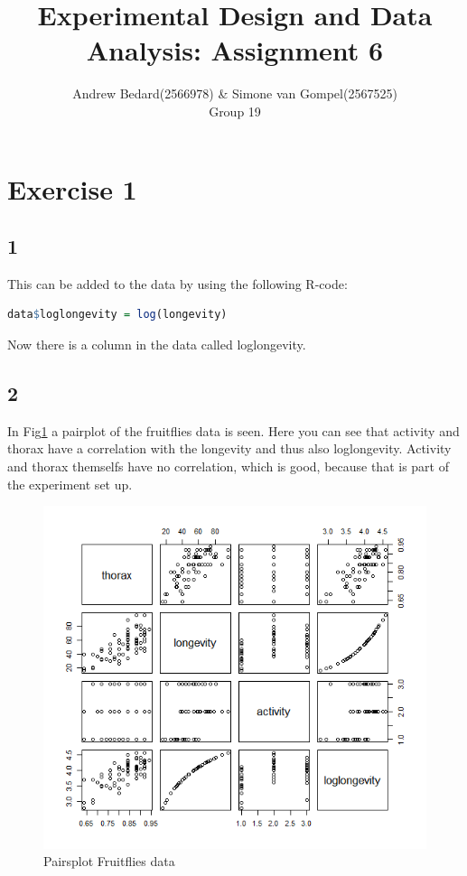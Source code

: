 \documentclass{article}
\title{Experimental Design and Data Analysis: Assignment 6}
\author{Andrew Bedard(2566978) \& Simone van Gompel(2567525) \\ Group 19}
\begin{document}
  \maketitle

  \section*{Exercise 1}
    \subsection*{1}
      This can be added to the data by using the following R-code:
      \begin{lstlisting}[language=R]
data$loglongevity = log(longevity)
      \end{lstlisting}
      Now there is a column in the data called loglongevity.

    \subsection*{2}
      In Fig\ref{fig:PairFruit} a pairplot of the fruitflies data is seen.
      Here you can see that activity and thorax have a correlation with the longevity and thus also loglongevity.
      Activity and thorax themselfs have no correlation, which is good, because that is part of the experiment set up.
      \begin{figure}[H]
          \centering
          \includegraphics[scale=0.3]{../results/fruitflies2.png}
          \caption{Pairsplot Fruitflies data}
          \label{fig:PairFruit}
      \end{figure}
\end{document}
